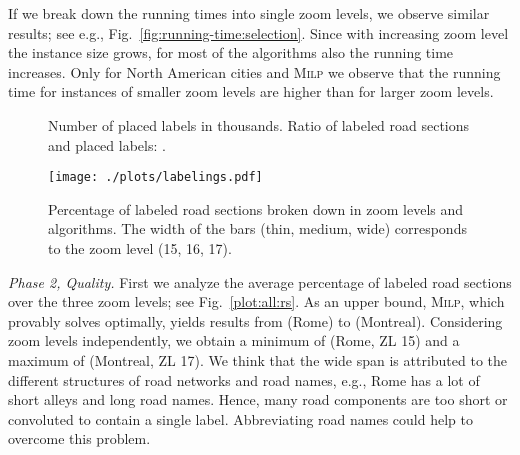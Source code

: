 \documentclass[a4paper,11pt]{article}
\newcommand{\ILPAlgo}{\textsc{Milp}\xspace}
\begin{document}
If we break down the running times into single zoom levels, we observe
similar results; see e.g.,
Fig.~\ref{fig:running-time:selection}. Since with increasing zoom level the instance size grows, for most of the algorithms also the
running time increases. Only for North American cities and \ILPAlgo we
observe that the running time for instances of smaller zoom levels are
higher than for larger zoom levels.

\begin{figure}[t]
\centering
{}
\caption{ Number of placed labels in thousands.  Ratio of labeled road sections and placed labels: .
}
\label{apx:fig:number-of-labels}
\end{figure}

\begin{figure}[t]
\centering
\texttt{[image: ./plots/labelings.pdf]}
\caption{Percentage of labeled road sections broken down in zoom levels and algorithms. The width of the bars (thin, medium, wide) corresponds to the zoom level  (15, 16, 17). 
}
\label{fig:quality:selection}
\vspace{-2ex}
\end{figure}

\textit{Phase 2, Quality.} First we analyze the average percentage of labeled
road sections over the three zoom levels; see
Fig.~\ref{plot:all:rs}. As an upper bound, \ILPAlgo, which provably 
solves \MaxTotalCovering optimally, yields results from  (Rome) to
 (Montreal). Considering zoom levels independently, we obtain
a minimum of  (Rome, ZL 15) and a maximum of   (Montreal, ZL 17). We think that the wide span is attributed to the different
structures of road networks and road names, e.g., Rome has a lot of
short alleys and long road names. Hence, many road components are too
short or convoluted to contain a single label. Abbreviating road names
could help to overcome this problem.
\end{document}
